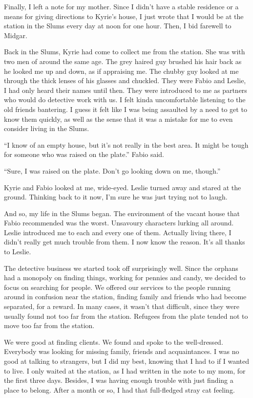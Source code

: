 \documentclass[oneside]{book}
\begin{document}
Finally, I left a note for my mother. Since I didn’t have a stable residence or a means for giving directions to Kyrie’s house, I just wrote that I would be at the station in the Slums every day at noon for one hour. Then, I bid farewell to Midgar.

Back in the Slums, Kyrie had come to collect me from the station. She was with two men of around the same age. The grey haired guy brushed his hair back as he looked me up and down, as if appraising me. The chubby guy looked at me through the thick lenses of his glasses and chuckled. They were Fabio and Leslie, I had only heard their names until then. They were introduced to me as partners who would do detective work with us. I felt kinda uncomfortable listening to the old friends bantering. I guess it felt like I was being assaulted by a need to get to know them quickly, as well as the sense that it was a mistake for me to even consider living in the Slums.

“I know of an empty house, but it’s not really in the best area. It might be tough for someone who was raised on the plate.” Fabio said.

“Sure, I was raised on the plate. Don’t go looking down on me, though.”

Kyrie and Fabio looked at me, wide-eyed. Leslie turned away and stared at the ground. Thinking back to it now, I’m sure he was just trying not to laugh.

And so, my life in the Slums began. The environment of the vacant house that Fabio recommended was the worst. Unsavoury characters lurking all around. Leslie introduced me to each and every one of them. Actually living there, I didn’t really get much trouble from them. I now know the reason. It’s all thanks to Leslie.

The detective business we started took off surprisingly well. Since the orphans had a monopoly on finding things, working for pennies and candy, we decided to focus on searching for people. We offered our services to the people running around in confusion near the station, finding family and friends who had become separated, for a reward. In many cases, it wasn’t that difficult, since they were usually found not too far from the station. Refugees from the plate tended not to move too far from the station.

We were good at finding clients. We found and spoke to the well-dressed. Everybody was looking for missing family, friends and acquaintances. I was no good at talking to strangers, but I did my best, knowing that I had to if I wanted to live. I only waited at the station, as I had written in the note to my mom, for the first three days. Besides, I was having enough trouble with just finding a place to belong. After a month or so, I had that full-fledged stray cat feeling.
\end{document}
